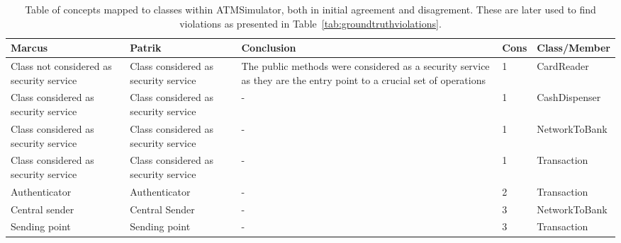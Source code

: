 \begin{table}[]
\begin{center}
\captionsetup{justification=centering}
\caption{Table of concepts mapped to classes within ATMSimulator, both in initial agreement and disagrement. These are later used to find violations as presented in Table~\ref{tab:groundtruthviolations}.}
\label{tab:groundtruthconceptincluded}
\hspace*{-2.7cm}
\begin{tabular}{p{3.5cm}p{3.5cm}p{3.5cm}ll}
\textbf{Marcus} & \textbf{Patrik} & \textbf{Conclusion} & \textbf{Cons} & \textbf{Class/Member} \\
\hline
Class not considered as security service & Class considered as security service & The public methods were considered as a security service as they are the entry point to a crucial set of operations & 1                   & CardReader                     \\
\rowcolor{RowColor}
Class considered as security service     & Class considered as security service & -                                                                                                              & 1                   & CashDispenser                  \\
Class considered as security service     & Class considered as security service & -                                                                                                              & 1                   & NetworkToBank                  \\
\rowcolor{RowColor}
Class considered as security service     & Class considered as security service & -                                                                                                              & 1                   & Transaction                 \\
Authenticator                            & Authenticator                        & -                                                                                                              & 2                   & Transaction                 \\
\rowcolor{RowColor}
Central sender                           & Central Sender                       & -                                                                                                              & 3                   & NetworkToBank                  \\
Sending point                            & Sending point                        & -                                                                                                              & 3                   & Transaction                 \\

\end{tabular}
\end{center}
\end{table}
